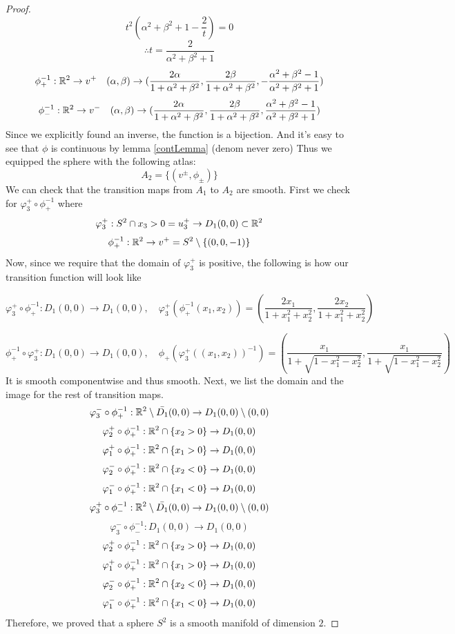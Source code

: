 \documentclass[11pt,a4paper]{report}
\begin{document}
\begin{proof}
$$ t^2 (\alpha^2 + \beta^2 +1 - \frac{2}{t} ) = 0 $$
$$ \therefore t = \frac{2}{\alpha^2 + \beta^2 +1 } $$
$$ \phi_{+}^{-1}:
\mathbb{R}^2 \to v^{+} 
\quad (\alpha, \beta)  \to
( \frac{2 \alpha}{1+\alpha^2+\beta^2},
  \frac{2 \beta}{1+\alpha^2+\beta^2},
  - \frac{\alpha^2+\beta^2-1}{\alpha^2+\beta^2+1})
$$
$$ \phi_{-}^{-1}:
\mathbb{R}^2 \to v^{-}
\quad (\alpha,\beta) \to
( \frac{2\alpha}{1+\alpha^2+\beta^2}, 
\frac{2\beta}{1+\alpha^2+\beta^2}, 
 \frac{\alpha^2 + \beta^2 -1}{\alpha^2+\beta^2+1} )
$$
Since we explicitly found an inverse, the function is a bijection.
\newline
And it's easy to see that $\phi$ is continuous by lemma \ref{contLemma} (denom never zero)
Thus we equipped the sphere with the following atlas:
$$ A_2 = \{(v^{\pm},\phi_{\pm}) \} $$
We can check that the transition maps from $A_1$ to $A_2$ are smooth. \newline
First we check for $\varphi_3^{+} \circ \phi_{+}^{-1}$ where
$$ \varphi_3^{+}: S^2 \cap {x_3 > 0} = u_3^{+} \to D_1(0,0) \subset \mathbb{R}^2 $$
$$ \phi_{+}^{-1}: \mathbb{R}^2 \to v^{+} = S^2 \setminus \{ (0,0,-1) \} $$
Now, since we require that the domain of $\varphi_3^{+}$ is positive, the following is how our transition function will look like

$$\varphi_3^{+} \circ \phi_{+}^{-1}: D_1 (0,0) \to D_1(0,0), \quad \varphi_3^{+}( \phi_{+}^{-1}(x_1,x_2)) = (\frac{2x_1}{1+x_1^2+x_2^2}, \frac{2x_2}{1+x_1^2+x_2^2})$$

$$ \phi_{+}^{-1} \circ \varphi_3^{+}: D_1 (0,0) \to D_1(0,0), \quad  \phi_{+}(\varphi_3^{+}((x_1,x_2) )^{-1}) = (\frac{x_1}{1+\sqrt{1-x_1^2-x_2^2}}, \frac{x_1}{1+\sqrt{1-x_1^2-x_2^2}})$$
It is smooth componentwise and thus smooth.
Next, we list the domain and the image for the rest of transition maps.
$$\varphi_3^{-} \circ \phi_{+}^{-1}: \mathbb{R}^2 \setminus \bar{D_1} (0,0) \to D_1(0,0) \setminus (0,0)$$
$$\varphi_2^{+} \circ \phi_{+}^{-1}: \mathbb{R}^2 \cap \{ x_2 > 0 \} \to D_1 (0,0)$$
$$\varphi_1^{+} \circ \phi_{+}^{-1}: \mathbb{R}^2 \cap \{ x_1 > 0 \} \to D_1 (0,0)$$
$$\varphi_2^{-} \circ \phi_{+}^{-1}: \mathbb{R}^2 \cap \{ x_2 < 0 \} \to D_1 (0,0)$$
$$\varphi_1^{-} \circ \phi_{+}^{-1}: \mathbb{R}^2 \cap \{ x_1 < 0 \} \to D_1 (0,0)$$
$$\varphi_3^{+} \circ \phi_{-}^{-1}: \mathbb{R}^2 \setminus \bar{D_1} (0,0) \to D_1(0,0) \setminus (0,0)$$
$$\varphi_3^{-} \circ \phi_{-}^{-1}: D_1 (0,0) \to D_1(0,0) $$
$$\varphi_2^{+} \circ \phi_{+}^{-1}: \mathbb{R}^2 \cap \{ x_2 > 0 \} \to D_1 (0,0)$$
$$\varphi_1^{+} \circ \phi_{+}^{-1}: \mathbb{R}^2 \cap \{ x_1 > 0 \} \to D_1 (0,0)$$
$$\varphi_2^{-} \circ \phi_{+}^{-1}: \mathbb{R}^2 \cap \{ x_2 < 0 \} \to D_1 (0,0)$$
$$\varphi_1^{-} \circ \phi_{+}^{-1}: \mathbb{R}^2 \cap \{ x_1 < 0 \} \to D_1 (0,0)$$
Therefore, we proved that a sphere $S^2$ is a smooth manifold of dimension $2$.
\end{proof}
\end{document}
